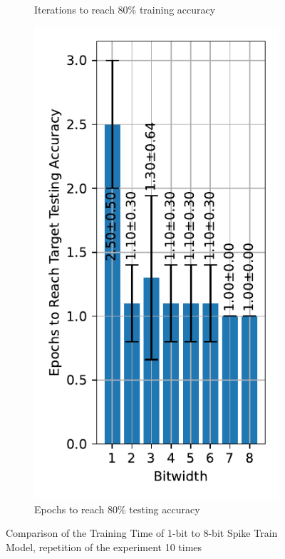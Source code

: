 \begin{figure}[!htpb]
\begin{subfigure}[H]{0.45\textwidth}
            \caption{Iterations to reach 80\% training accuracy}
        \end{subfigure}
        \hfill
        \begin{subfigure}[H]{0.45\textwidth}
            \centering
            \includegraphics[width=\textwidth]{../standard/FashionMNIST/plots/fashionmnist_test_iters.pdf}
            \caption{Epochs to reach 80\% testing accuracy}
        \end{subfigure}
        \caption{Comparison of the Training Time of 1-bit to 8-bit Spike Train Model, repetition of the experiment 10 times}
        \label{fig:iterations_fixed_accuracy}
    \end{figure}


